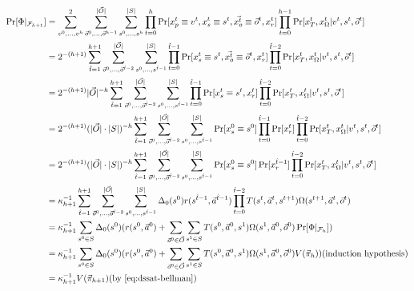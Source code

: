 \begin{tcolorbox}[colback=white]
    \scriptsize
    \begin{align*}
        \Pr[\Phi|_{\mathcal{F}_{h+1}}] & =\sum_{v^0,\ldots,v^h}^{2}\sum_{\vec{o}^0,\ldots,\vec{o}^{h-1}}^{|\vec{O}|}\sum_{s^0,\ldots,s^h}^{|S|}\prod_{t=0}^h\Pr[x_p^t \equiv v^t,x_s^t \equiv s^t,\vec{x_o^t} \equiv \vec{o}^t,x_r^t]\prod_{t=0}^{h-1}\Pr[x_T^t,x_\Omega^t|v^t,s^t,\vec{o}^t]                      \\
                                       & =2^{-(h+1)}\sum_{\hat{t}=1}^{h+1}\sum_{\vec{o}^0,\ldots,\vec{o}^{\hat{t}-2}}^{|\vec{O}|}\sum_{s^0,\ldots,s^{\hat{t}-1}}^{|S|}\prod_{t=0}^{\hat{t}-1}\Pr[x_s^t \equiv s^t,\vec{x_o^t}\equiv\vec{o}^t,x_r^t]\prod_{t=0}^{\hat{t}-2}\Pr[x_T^t,x_\Omega^t|v^t,s^t,\vec{o}^t]  \\
                                       & =2^{-(h+1)}|\vec{O}|^{-h}\sum_{\hat{t}=1}^{h+1}\sum_{\vec{o}^0,\ldots,\vec{o}^{\hat{t}-2}}^{|\vec{O}|}\sum_{s^0,\ldots,s^{\hat{t}-1}}^{|S|}\prod_{t=0}^{\hat{t}-1}\Pr[x_s^t \equiv s^t,x_r^t]\prod_{t=0}^{\hat{t}-2}\Pr[x_T^t,x_\Omega^t|v^t,s^t,\vec{o}^t]               \\
                                       & =2^{-(h+1)}(|\vec{O}|\cdot|S|)^{-h}\sum_{\hat{t}=1}^{h+1}\sum_{\vec{o}^0,\ldots,\vec{o}^{\hat{t}-2}}^{|\vec{O}|}\sum_{s^0,\ldots,s^{\hat{t}-1}}^{|S|}\Pr[x_s^0 \equiv s^0]\prod_{t=0}^{\hat{t}-1}\Pr[x_r^t]\prod_{t=0}^{\hat{t}-2}\Pr[x_T^t,x_\Omega^t|v^t,s^t,\vec{o}^t] \\
                                       & =2^{-(h+1)}(|\vec{O}|\cdot|S|)^{-h}\sum_{\hat{t}=1}^{h+1}\sum_{\vec{o}^0,\ldots,\vec{o}^{\hat{t}-2}}^{|\vec{O}|}\sum_{s^0,\ldots,s^{\hat{t}-1}}^{|S|}\Pr[x_s^0 \equiv s^0]\Pr[x_r^{\hat{t}-1}]\prod_{t=0}^{\hat{t}-2}\Pr[x_T^t,x_\Omega^t|v^t,s^t,\vec{o}^t]              \\
                                       & =\kappa_{h+1}^{-1}\sum_{\hat{t}=1}^{h+1}\sum_{\vec{o}^0,\ldots,\vec{o}^{\hat{t}-2}}^{|\vec{O}|}\sum_{s^0,\ldots,s^{\hat{t}-1}}^{|S|}\Delta_0(s^0)r(s^{\hat{t}-1},\vec{a}^{\hat{t}-1})\prod_{t=0}^{\hat{t}-2}T(s^t,\vec{a}^t,s^{t+1})\Omega(s^{t+1},\vec{a}^t,\vec{o}^t)   \\
                                       & =\kappa_{h+1}^{-1}\sum_{s^0\in S}\Delta_0(s^0)(r(s^0,\vec{a}^0)+\sum_{\vec{o}^0\in \vec{O}}\sum_{s^1\in S}T(s^0,\vec{a}^0,s^1)\Omega(s^1,\vec{a}^0,\vec{o}^0)\Pr[\Phi|_{\mathcal{F}_h}])                                                                                  \\
                                       & =\kappa_{h+1}^{-1}\sum_{s^0\in S}\Delta_0(s^0)(r(s^0,\vec{a}^0)+\sum_{\vec{o}^0\in \vec{O}}\sum_{s^1\in S}T(s^0,\vec{a}^0,s^1)\Omega(s^1,\vec{a}^0,\vec{o}^0)V(\vec{\pi}_h))\text{(induction hypothesis)}                                                                 \\
                                       & =\kappa_{h+1}^{-1} V(\vec{\pi}_{h+1})\text{(by \Cref{eq:dssat-bellman})}
    \end{align*}
\end{tcolorbox}